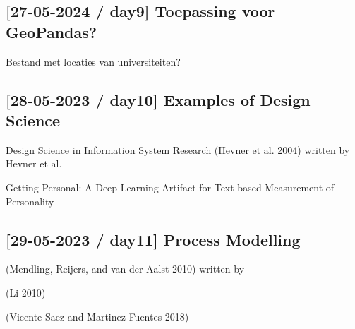 \documentclass[
  letterpaper,
  DIV=11,
  numbers=noendperiod]{scrartcl}
\begin{document}
\hypertarget{day9-toepassing-voor-geopandas}{%
\subsection{{[}27-05-2024 / day9{]} Toepassing voor
GeoPandas?}\label{day9-toepassing-voor-geopandas}}

Bestand met locaties van universiteiten?

\hypertarget{day10-examples-of-design-science}{%
\subsection{{[}28-05-2023 / day10{]} Examples of Design
Science}\label{day10-examples-of-design-science}}

Design Science in Information System Research (Hevner et al. 2004)
written by Hevner et
al.~

Getting Personal: A Deep Learning Artifact for Text-based Measurement of
Personality

\hypertarget{day11-process-modelling}{%
\subsection{{[}29-05-2023 / day11{]} Process
Modelling}\label{day11-process-modelling}}

(Mendling, Reijers, and van der Aalst 2010) written by

(Li 2010)

(Vicente-Saez and Martinez-Fuentes 2018)
\end{document}
